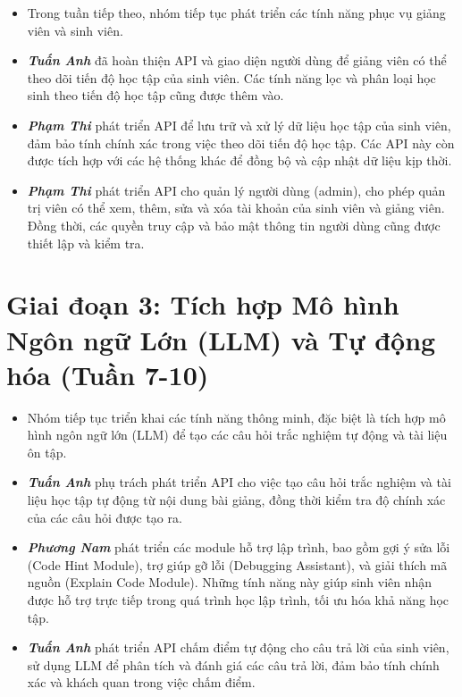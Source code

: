 \begin{itemize}[label=-]
    \item Trong tuần tiếp theo, nhóm tiếp tục phát triển các tính năng phục vụ giảng viên và sinh viên. 
    \item \textbf{\textit{Tuấn Anh}} đã hoàn thiện API và giao diện người dùng để giảng viên có thể theo dõi tiến độ học tập của sinh viên. Các tính năng lọc và phân loại học sinh theo tiến độ học tập cũng được thêm vào.
    \item \textbf{\textit{Phạm Thi}} phát triển API để lưu trữ và xử lý dữ liệu học tập của sinh viên, đảm bảo tính chính xác trong việc theo dõi tiến độ học tập. Các API này còn được tích hợp với các hệ thống khác để đồng bộ và cập nhật dữ liệu kịp thời.
    \item \textbf{\textit{Phạm Thi}} phát triển API cho quản lý người dùng (admin), cho phép quản trị viên có thể xem, thêm, sửa và xóa tài khoản của sinh viên và giảng viên. Đồng thời, các quyền truy cập và bảo mật thông tin người dùng cũng được thiết lập và kiểm tra.
\end{itemize}

\section{Giai đoạn 3: Tích hợp Mô hình Ngôn ngữ Lớn (LLM) và Tự động hóa (Tuần 7-10)}

\begin{itemize}[label=-]
    \item Nhóm tiếp tục triển khai các tính năng thông minh, đặc biệt là tích hợp mô hình ngôn ngữ lớn (LLM) để tạo các câu hỏi trắc nghiệm tự động và tài liệu ôn tập.
    \item \textbf{\textit{Tuấn Anh}} phụ trách phát triển API cho việc tạo câu hỏi trắc nghiệm và tài liệu học tập tự động từ nội dung bài giảng, đồng thời kiểm tra độ chính xác của các câu hỏi được tạo ra.
    \item \textbf{\textit{Phương Nam}} phát triển các module hỗ trợ lập trình, bao gồm gợi ý sửa lỗi (Code Hint Module), trợ giúp gỡ lỗi (Debugging Assistant), và giải thích mã nguồn (Explain Code Module). Những tính năng này giúp sinh viên nhận được hỗ trợ trực tiếp trong quá trình học lập trình, tối ưu hóa khả năng học tập.
    \item \textbf{\textit{Tuấn Anh}} phát triển API chấm điểm tự động cho câu trả lời của sinh viên, sử dụng LLM để phân tích và đánh giá các câu trả lời, đảm bảo tính chính xác và khách quan trong việc chấm điểm.
\end{itemize}

